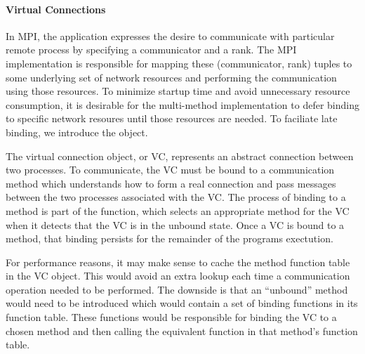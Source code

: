 
\paragraph{Virtual Connections}

% 
% 

In MPI, the application expresses the desire to communicate with particular
remote process by specifying a communicator and a rank.  The MPI implementation
is responsible for mapping these (communicator, rank) tuples to some underlying
set of network resources and performing the communication using those
resources.  To minimize startup time and avoid unnecessary resource
consumption, it is desirable for the multi-method implementation to defer
binding to specific network resoures until those resources are needed.  To
faciliate late binding, we introduce the  object.

The virtual connection object, or VC, represents an abstract connection between
two processes.  To communicate, the VC must be bound to a communication method
which understands how to form a real connection and pass messages between the
two processes associated with the VC.  The process of binding to a method is
part of the  function, which selects an
appropriate method for the VC when it detects that the VC is in the unbound
state.  Once a VC is bound to a method, that binding persists for the remainder
of the programs exectution.

\begin{implnote}
  For performance reasons, it may make sense to cache the method function table
  in the VC object.  This would avoid an extra lookup each time a communication
  operation needed to be performed.  The downside is that an ``unbound'' method
  would need to be introduced which would contain a set of binding functions in
  its function table.  These functions would be responsible for binding the VC
  to a chosen method and then calling the equivalent function in that method's
  function table.
\end{implnote}

